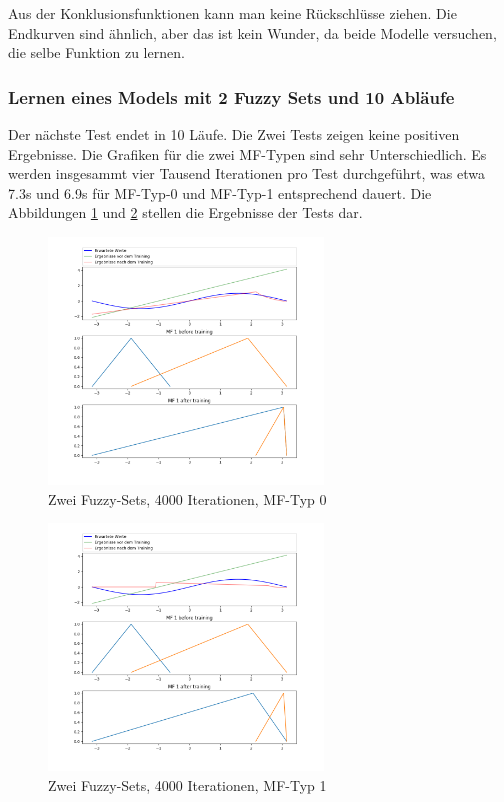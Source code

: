Aus der Konklusionsfunktionen kann man keine Rückschlüsse ziehen. Die Endkurven sind ähnlich, aber das ist kein Wunder, da beide Modelle versuchen, die selbe Funktion zu lernen. 

\subsubsection{Lernen eines Models mit 2 Fuzzy Sets und 10 Abläufe}\label{m2fs10ab}

Der nächste Test endet in 10 Läufe. Die Zwei Tests zeigen keine positiven Ergebnisse. Die Grafiken für die zwei MF-Typen sind sehr Unterschiedlich. Es werden insgesammt vier Tausend Iterationen pro Test durchgeführt, was etwa 7.3s und 6.9s für MF-Typ-0 und MF-Typ-1 entsprechend dauert. Die Abbildungen \ref{2Sets4000_Stoch_0} und \ref{2Sets4000_Stoch_1} stellen die Ergebnisse der Tests dar.

\begin{figure}[htbp]
	\centering
	\includegraphics[width=0.65\textwidth]{images/sinus/Stochastic/sinus 1 Input 2 Sets 4000 Epochs Stochastic Gradient Descent two equations mf.png}
	\caption{Zwei Fuzzy-Sets, 4000 Iterationen, MF-Typ 0} \label{2Sets4000_Stoch_0}
\end{figure}
\begin{figure}[htbp]
	\centering
	\includegraphics[width=0.65\textwidth]{images/sinus/Stochastic/sinus 1 Input 2 Sets 4000 Epochs Stochastic Gradient Descent one equation mf.png}
	\caption{Zwei Fuzzy-Sets, 4000 Iterationen, MF-Typ 1} \label{2Sets4000_Stoch_1}
\end{figure}

